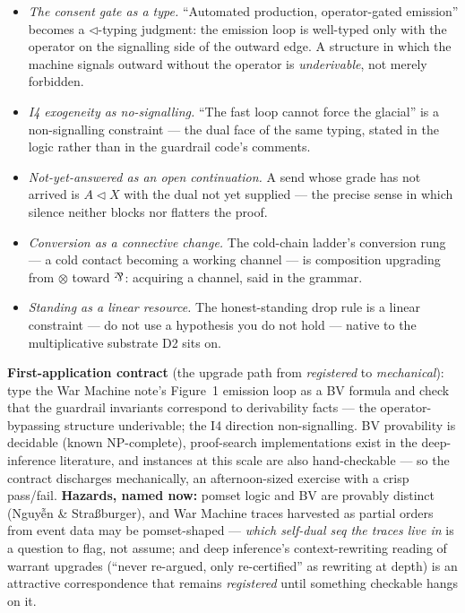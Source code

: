 \documentclass[11pt]{article}
\newcommand{\warrant}[1]{\textsl{#1}}
\newcommand{\parr}{\rotatebox[origin=c]{180}{\&}}
\newcommand{\seq}{\mathbin{\triangleleft}}
\begin{document}
\begin{itemize}
\item \emph{The consent gate as a type.} ``Automated production,
operator-gated emission'' becomes a $\seq$-typing judgment: the
emission loop is well-typed only with the operator on the
signalling side of the outward edge. A structure in which the
machine signals outward without the operator is \emph{underivable},
not merely forbidden.
\item \emph{I4 exogeneity as no-signalling.} ``The fast loop cannot
force the glacial'' is a non-signalling constraint --- the dual
face of the same typing, stated in the logic rather than in the
guardrail code's comments.
\item \emph{Not-yet-answered as an open continuation.} A send whose
grade has not arrived is $A \seq X$ with the dual not yet supplied
--- the precise sense in which silence neither blocks nor flatters
the proof.
\item \emph{Conversion as a connective change.} The cold-chain
ladder's conversion rung --- a cold contact becoming a working
channel --- is composition upgrading from $\otimes$ toward $\parr$:
acquiring a channel, said in the grammar.
\item \emph{Standing as a linear resource.} The honest-standing
drop rule is a linear constraint --- do not use a hypothesis you do
not hold --- native to the multiplicative substrate D2 sits on.
\end{itemize}

\textbf{First-application contract} (the upgrade path from
\warrant{registered} to \warrant{mechanical}): type the War Machine
note's Figure~1 emission loop as a BV formula and check that the
guardrail invariants correspond to derivability facts --- the
operator-bypassing structure underivable; the I4 direction
non-signalling. BV provability is decidable (known NP-complete),
proof-search implementations exist in the deep-inference
literature, and instances at this scale are also hand-checkable ---
so the contract discharges mechanically, an afternoon-sized
exercise with a crisp pass/fail. \textbf{Hazards, named now:}
pomset logic and BV are provably distinct (Nguy\~{\^e}n \&
Stra{\ss}burger), and War Machine traces harvested as partial
orders from event data may be pomset-shaped --- \emph{which
self-dual seq the traces live in} is a question to flag, not
assume; and deep inference's context-rewriting reading of warrant
upgrades (``never re-argued, only re-certified'' as rewriting at
depth) is an attractive correspondence that remains
\warrant{registered} until something checkable hangs on it.
\end{document}
